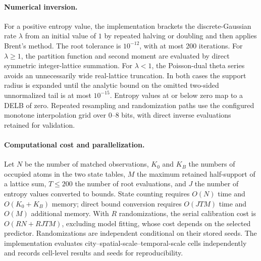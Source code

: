 \paragraph{Numerical inversion.}
For a positive entropy value, the implementation brackets the
discrete-Gaussian rate \(\lambda\) from an initial value of \(1\) by repeated
halving or doubling and then applies Brent's method. The root tolerance is
\(10^{-12}\), with at most 200 iterations. For \(\lambda\geq1\), the
partition function and second moment are evaluated by direct symmetric
integer-lattice summation. For \(\lambda<1\), the Poisson-dual theta series
avoids an unnecessarily wide real-lattice truncation. In both cases the
support radius is expanded until the analytic bound on the omitted
two-sided unnormalized tail is at most \(10^{-15}\). Entropy values at or
below zero map to a DELB of zero. Repeated resampling and randomization paths
use the configured monotone interpolation grid over 0--8 bits, with direct
inverse evaluations retained for validation.

\paragraph{Computational cost and parallelization.}
Let \(N\) be the number of matched observations, \(K_0\) and \(K_B\) the
numbers of occupied atoms in the two state tables, \(M\) the maximum retained
half-support of a lattice sum, \(T\leq200\) the number of root evaluations,
and \(J\) the number of entropy values converted to bounds. State counting
requires \(O(N)\) time and \(O(K_0+K_B)\) memory; direct bound conversion
requires \(O(JTM)\) time and \(O(M)\) additional memory. With \(R\)
randomizations, the serial calibration cost is
\(O(RN+RJTM)\), excluding model fitting, whose cost depends on the selected
predictor. Randomizations are independent conditional on their stored seeds.
The implementation evaluates city--spatial-scale--temporal-scale cells
independently and records cell-level results and seeds for reproducibility.
